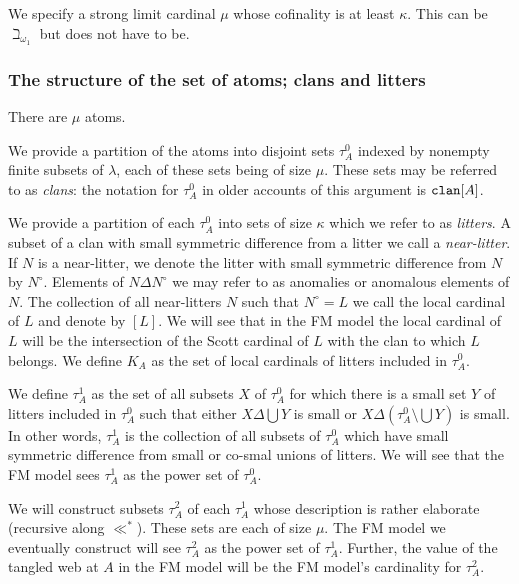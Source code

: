 \documentclass[12pt]{article}
\begin{document}
We specify a strong limit cardinal $\mu$ whose cofinality is at least $\kappa$.  This can be $\beth_{\omega_1}$ but does not have to be.

\newpage

\subsubsection{The structure of the set of atoms; clans and litters}

There are $\mu$ atoms.

We provide a partition of the atoms into disjoint sets $\tau^0_A$ indexed by nonempty finite subsets of $\lambda$, each of these sets being of size $\mu$.
These sets may be referred to as {\em clans}: the notation for $\tau^0_A$ in older accounts of this argument is ${\tt clan}[A]$.

We provide a partition of each $\tau^0_A$ into sets of size $\kappa$ which we refer to as {\em litters\/}.  A subset of a clan with small symmetric difference from a litter
we call a {\em near-litter\/}.  If $N$ is a near-litter, we denote the litter with small symmetric difference from $N$ by $N^{\circ}$.  Elements of $N \Delta N^{\circ}$ we may refer to as anomalies or anomalous elements of $N$.  The collection of all near-litters $N$ such that $N^{\circ}=L$ we call the local cardinal of $L$ and denote by $[L]$.  We will see that in the FM model the local cardinal of $L$ will be the intersection of the Scott cardinal of $L$ with the clan to which $L$ belongs.  We define $K_A$ as the set of local cardinals of litters included in $\tau^0_A$.

We define $\tau^1_A$ as the set of all subsets $X$ of $\tau^0_A$ for which there is a small set $Y$ of litters included in $\tau^0_A$ such that either $X \Delta \bigcup Y$ is small
or $X \Delta (\tau^0_A \setminus \bigcup Y)$ is small.  In other words, $\tau^1_A$ is the collection of all subsets of $\tau^0_A$ which have small symmetric difference from small or co-smal unions of litters.  We will see that the FM model sees $\tau^1_A$ as the power set of $\tau^0_A$.

We will construct subsets $\tau^2_A$ of each $\tau^1_A$ whose description is rather elaborate (recursive along $\ll^*$).  These sets are each of size $\mu$.  The FM model we eventually
construct will see $\tau^2_A$ as the power set of $\tau^1_A$.  Further, the value of the tangled web at $A$ in the FM model will be the FM model's cardinality for $\tau^2_A$.

\newpage
\end{document}
